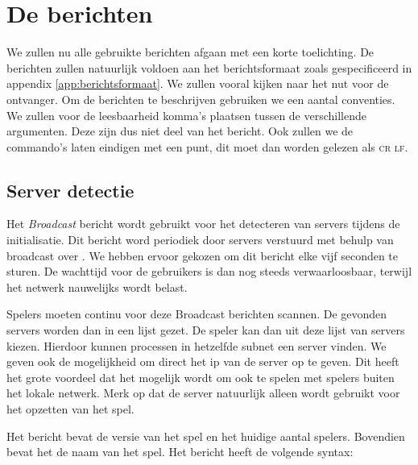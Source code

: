     \section{De berichten}
    \label{app:berichten}
    We zullen nu alle gebruikte berichten afgaan met een korte toelichting. De berichten zullen natuurlijk voldoen aan het berichtsformaat zoals gespecificeerd in appendix \ref{app:berichtsformaat}. We zullen vooral kijken naar het nut voor de ontvanger. Om de berichten te beschrijven gebruiken we een aantal conventies. We zullen voor de leesbaarheid komma's plaatsen tussen de verschillende argumenten. Deze zijn dus niet deel van het bericht. Ook zullen we de commando's laten eindigen met een punt, dit moet dan worden gelezen als \textsc{cr lf}.

    \subsection{Server detectie}
    Het \emph{Broadcast} bericht wordt gebruikt voor het detecteren van servers tijdens de initialisatie. Dit bericht word periodiek door servers verstuurd met behulp van broadcast over \udp. We hebben ervoor gekozen om dit bericht elke vijf seconden te sturen. De wachttijd voor de gebruikers is dan nog steeds verwaarloosbaar, terwijl het netwerk nauwelijks wordt belast.

    Spelers moeten continu voor deze Broadcast berichten scannen. De gevonden servers worden dan in een lijst gezet. De speler kan dan uit deze lijst van servers kiezen. Hierdoor kunnen processen in hetzelfde subnet een server vinden. We geven ook de mogelijkheid om direct het ip van de server op te geven. Dit heeft het grote voordeel dat het mogelijk wordt om ook te spelen met spelers buiten het lokale netwerk. Merk op dat de server natuurlijk alleen wordt gebruikt voor het opzetten van het spel.

    Het bericht bevat de versie van het spel en het huidige aantal spelers. Bovendien bevat het de naam van het spel. Het bericht heeft de volgende syntax:

